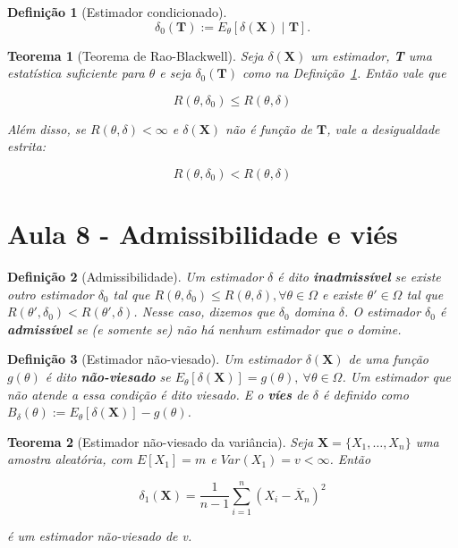 \documentclass{article}
\newtheorem{theorem}{Teorema}
\newtheorem{definition}{Definição}
\begin{document}
\begin{definition}[Estimador condicionado]\label{def:est. cond.}
\begin{equation}
    \delta_0 (\textbf{T}) := E_\theta \left [ \delta(\textbf{X}) \mid \textbf{T} \right ].
\end{equation}
\end{definition}

\begin{theorem}[Teorema de Rao-Blackwell]
Seja $\delta(\textbf{X})$ um estimador, \textbf{T} uma estatística suficiente para $\theta$ e seja $\delta_0(\textbf{T})$ como na Definição~\ref{def:est. cond.}. Então vale que

$$R(\theta, \delta_0) \leq R(\theta, \delta)$$

Além disso, se $R(\theta, \delta) < \infty$ e $\delta (\textbf{X})$ não é função de $\textbf{T}$, vale a desigualdade estrita:

$$R(\theta, \delta_0) < R(\theta, \delta)$$
\end{theorem}

\section*{Aula 8 - Admissibilidade e viés}

\begin{definition}[Admissibilidade]
Um estimador $\delta$ é dito \textbf{inadmissível} se existe outro estimador $\delta_0$ tal que $R(\theta, \delta_0) \leq R(\theta, \delta), \forall \theta \in \Omega$ e existe $\theta' \in \Omega$ tal que $R(\theta', \delta_0) < R(\theta', \delta)$. Nesse caso, dizemos que $\delta_0$ domina $\delta$. O estimador $\delta_0$ é \textbf{admissível} se (e somente se) não há nenhum estimador que o domine.
\end{definition}

\begin{definition}[Estimador não-viesado]
Um estimador $\delta(\textbf{X})$ de uma função $g(\theta)$ é dito \textbf{não-viesado} se $E_\theta[\delta(\textbf{X})] = g(\theta), \ \forall \theta \in \Omega$. Um estimador que não atende a essa condição é dito viesado. E o \textbf{víes} de $\delta$ é definido como $B_\delta(\theta) := E_\theta[\delta(\textbf{X})] - g(\theta)$.
\end{definition}

\begin{theorem}[Estimador não-viesado da variância]
Seja $\textbf{X} = \{ X_1, \ldots, X_n \}$ uma amostra aleatória, com $E[X_1] = m$ e $Var(X_1) = v < \infty$. Então

$$\delta_1(\textbf{X}) = \frac{1}{n - 1}\sum_{i = 1}^n (X_i - \overline{X}_n)^2$$

é um estimador não-viesado de v.
\end{theorem}
\end{document}

